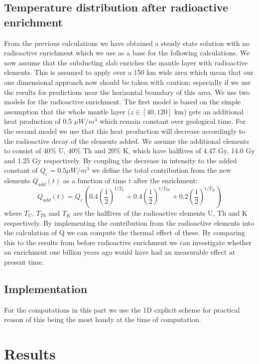 \documentclass[%
 reprint,
nofootinbib,
aps,
]{revtex4-1}
\begin{document}
\subsection{Temperature distribution after radioactive enrichment}
From the previous calculations we have obtained a steady state solution with no radioactive enrichment which we use as a base for the following calculations. We now assume that the subducting slab enriches the mantle layer with radioactive elements. This is assumed to apply over a 150 km wide area which mean that our one dimensional approach now should be taken with caution; especially if we use the results for predictions near the horizontal boundary of this area. We use two models for the radioactive enrichment. The first model is based on the simple assumption that the whole mantle layer ($z \in [40, 120]$ km) gets an additional heat production of 0.5 $\mu W/m^3$ which remain constant over geological time. For the second model we use that this heat production will decrease accordingly to the radioactive decay of the elements added. We assume the additional elements to consist of 40\% U, 40\% Th and 20\% K, which have halflives of 4.47 Gy, 14.0 Gy and 1.25 Gy respectively. By coupling the decrease in intensity to the added constant of $Q_{c}=0.5\mu W/m^3$ we define the total contribution from the new elements $Q_{add}(t)$ as a function of time $t$ after the enrichment:
\begin{equation}
    Q_{add}(t) = Q_{c} \left(0.4\left(\frac{1}{2}\right)^{t/T_U} + 0.4\left(\frac{1}{2}\right)^{t/T_{Th}} + 0.2\left(\frac{1}{2}\right)^{t/T_K}\right)
    \label{eq:Q_decay}
\end{equation}
where $T_U$, $T_{Th}$ and $T_K$ are the halflives of the radioactive elements U, Th and K respectively. By implementing the contribution from the radioactive elements into the calculation of Q we can compute the thermal effect of these. By comparing this to the results from before radioactive enrichment we can investigate whether an enrichment one billion years ago would have had an measurable effect at present time.

\subsection{Implementation}
For the computations in this part we use the 1D explicit scheme for practical reason of this being the most handy at the time of computation.


\section{Results}
\end{document}
